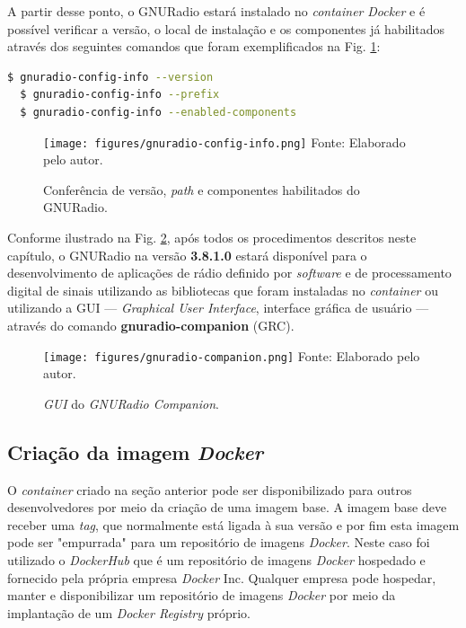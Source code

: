 \documentclass[
  12pt,				%
  openright,			%
  twoside,			%
  a4paper,			%
  english,			%
  french,				%
  spanish,			%
  brazil,				%
  ]{abntex2}
\begin{document}
A partir desse ponto, o GNURadio estará instalado no \textit{container} \textit{Docker} e é possível verificar a versão, o local de instalação e os
componentes já habilitados através dos seguintes comandos que foram exemplificados na Fig. \ref{fig:gnuradio-config-info}:

\begin{adjustbox}{max width=\linewidth}
  \begin{lstlisting}[language=bash]
  $ gnuradio-config-info --version
  $ gnuradio-config-info --prefix
  $ gnuradio-config-info --enabled-components
\end{lstlisting}
\end{adjustbox}

\begin{figure}[!htb]
  \centering
  \caption{Conferência de versão, \textit{path} e componentes habilitados do GNURadio.}
  \texttt{[image: figures/gnuradio-config-info.png]}
  Fonte: Elaborado pelo autor.
  \label{fig:gnuradio-config-info}
\end{figure}

Conforme ilustrado na Fig. \ref{fig:gnuradio-companion}, após todos os procedimentos descritos neste capítulo, o GNURadio na versão \textbf{3.8.1.0} estará
disponível para o desenvolvimento de aplicações de rádio definido por \textit{software} e de processamento digital de sinais utilizando as bibliotecas
que foram instaladas no \textit{container} ou utilizando a GUI — \textit{Graphical User Interface}, interface gráfica de usuário —
através do comando \textbf{gnuradio-companion} (GRC).

\begin{figure}[!htb]
  \centering
  \caption{\textit{GUI} do \textit{GNURadio Companion}.}
  \texttt{[image: figures/gnuradio-companion.png]}
  Fonte: Elaborado pelo autor.
  \label{fig:gnuradio-companion}
\end{figure}

\subsection*{Criação da imagem \textit{Docker}}

O \textit{container} criado na seção anterior pode ser disponibilizado para outros desenvolvedores por meio da criação de uma imagem
base. A imagem base deve receber uma \textit{tag}, que normalmente está ligada à sua versão e por fim esta imagem pode ser
"empurrada" para um repositório de imagens \textit{Docker}. Neste caso foi utilizado o \textit{DockerHub} que é um repositório
de imagens \textit{Docker} hospedado e fornecido pela própria empresa \textit{Docker} Inc. Qualquer empresa pode hospedar, manter
e disponibilizar um repositório de imagens \textit{Docker} por meio da implantação de um \textit{Docker Registry} próprio.
\end{document}
